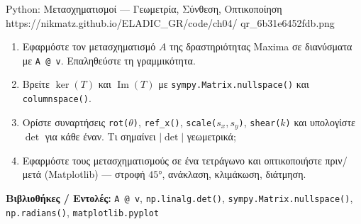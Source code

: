 \begin{pybox}{Python: Μετασχηματισμοί — Γεωμετρία, Σύνθεση, Οπτικοποίηση}%
             {https://nikmatz.github.io/ELADIC_GR/code/ch04/}%
             {qr_6b31e6452fdb.png}
\label{py:ch4_linear_transforms}
\begin{enumerate}[label=(\alph*),itemsep=2pt]
  \item Εφαρμόστε τον μετασχηματισμό $A$ της δραστηριότητας Maxima
    σε διανύσματα με \texttt{A @ v}. Επαληθεύστε τη γραμμικότητα.
  \item Βρείτε $\ker(T)$ και $\operatorname{Im}(T)$ με
    \texttt{sympy.Matrix.nullspace()} και \texttt{columnspace()}.
  \item Ορίστε συναρτήσεις \texttt{rot($\theta$)}, \texttt{ref\_x()},
    \texttt{scale($s_x,s_y$)}, \texttt{shear($k$)} και υπολογίστε
    $\det$ για κάθε έναν. Τι σημαίνει $|\det|$ γεωμετρικά;
  \item Εφαρμόστε τους μετασχηματισμούς σε ένα τετράγωνο και
    οπτικοποιήστε πριν/μετά (Matplotlib) — στροφή $45°$, ανάκλαση,
    κλιμάκωση, διάτμηση.
\end{enumerate}
\medskip
\textbf{Βιβλιοθήκες / Εντολές:}
\texttt{A @ v}, \texttt{np.linalg.det()},
\texttt{sympy.Matrix.nullspace()},
\texttt{np.radians()}, \texttt{matplotlib.pyplot}
\end{pybox}
